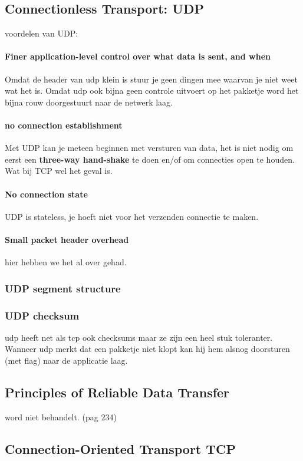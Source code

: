 \subsection{Connectionless Transport: UDP}
voordelen van UDP:
\paragraph{Finer application-level control over what data is sent, and when} Omdat de header van udp klein is stuur je geen dingen mee waarvan je niet weet wat het is. Omdat udp ook bijna geen controle uitvoert op het pakketje word het bijna rouw doorgestuurt naar de netwerk laag.
\paragraph{no connection establishment} Met UDP kan je meteen beginnen met versturen van data, het is niet nodig om eerst een \textbf{three-way hand-shake} te doen en/of om connecties open te houden. Wat bij TCP wel het geval is.
\paragraph{No connection state} UDP is stateless, je hoeft niet voor het verzenden connectie te maken.
\paragraph{Small packet header overhead} hier hebben we het al over gehad.
\subsubsection{UDP segment structure}
\subsubsection{UDP checksum}
udp heeft net als tcp ook checksums maar ze zijn een heel stuk toleranter. Wanneer udp merkt dat een pakketje niet klopt kan hij hem alsnog doorsturen (met flag) naar de applicatie laag.
\subsection{Principles of Reliable Data Transfer}
word niet behandelt. (pag 234)
\subsection{Connection-Oriented Transport TCP}
